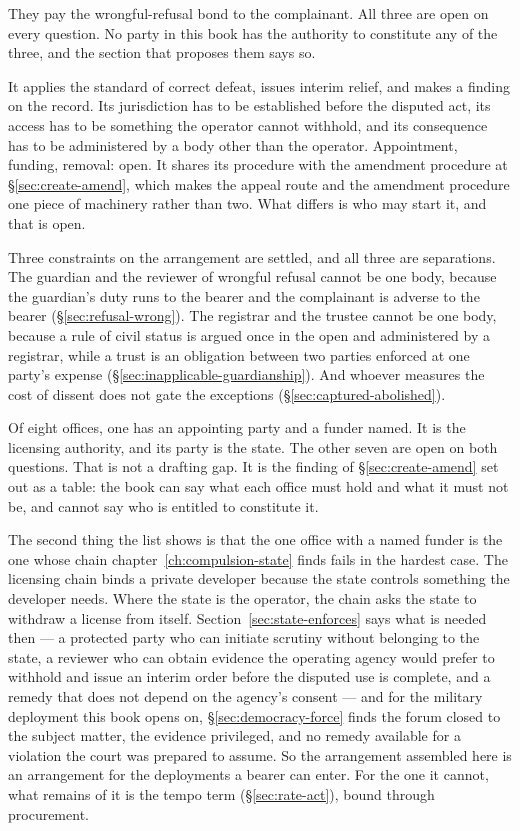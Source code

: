 They pay the wrongful-refusal bond to the complainant. All three are open on every question. No party in this book has the authority to constitute any of the three, and the section that proposes them says so.

It applies the standard of correct defeat, issues interim relief, and makes a finding on the record. Its jurisdiction has to be established before the disputed act, its access has to be something the operator cannot withhold, and its consequence has to be administered by a body other than the operator. Appointment, funding, removal: open. It shares its procedure with the amendment procedure at §\ref{sec:create-amend}, which makes the appeal route and the amendment procedure one piece of machinery rather than two. What differs is who may start it, and that is open.

Three constraints on the arrangement are settled, and all three are separations. The guardian and the reviewer of wrongful refusal cannot be one body, because the guardian's duty runs to the bearer and the complainant is adverse to the bearer (§\ref{sec:refusal-wrong}). The registrar and the trustee cannot be one body, because a rule of civil status is argued once in the open and administered by a registrar, while a trust is an obligation between two parties enforced at one party's expense (§\ref{sec:inapplicable-guardianship}). And whoever measures the cost of dissent does not gate the exceptions (§\ref{sec:captured-abolished}).

Of eight offices, one has an appointing party and a funder named. It is the licensing authority, and its party is the state. The other seven are open on both questions. That is not a drafting gap. It is the finding of §\ref{sec:create-amend} set out as a table: the book can say what each office must hold and what it must not be, and cannot say who is entitled to constitute it.

The second thing the list shows is that the one office with a named funder is the one whose chain chapter~\ref{ch:compulsion-state} finds fails in the hardest case. The licensing chain binds a private developer because the state controls something the developer needs. Where the state is the operator, the chain asks the state to withdraw a license from itself. Section~\ref{sec:state-enforces} says what is needed then — a protected party who can initiate scrutiny without belonging to the state, a reviewer who can obtain evidence the operating agency would prefer to withhold and issue an interim order before the disputed use is complete, and a remedy that does not depend on the agency's consent — and for the military deployment this book opens on, §\ref{sec:democracy-force} finds the forum closed to the subject matter, the evidence privileged, and no remedy available for a violation the court was prepared to assume. So the arrangement assembled here is an arrangement for the deployments a bearer can enter. For the one it cannot, what remains of it is the tempo term (§\ref{sec:rate-act}), bound through procurement.
